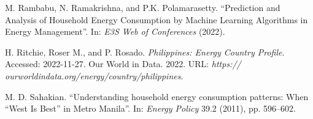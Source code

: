 \documentclass[runningheads]{llncs}
\begin{document}
\begin{thebibliography}{15}
M. Rambabu, N. Ramakrishna, and P.K. Polamarasetty. “Prediction and Analysis of Household Energy Consumption by Machine Learning Algorithms in Energy Management”. In: \textit{E3S Web of Conferences} (2022).

H. Ritchie, Roser M., and P. Rosado. \textit{Philippines: Energy Country Profile}. Accessed: 2022-11-27. Our World in Data. 2022. URL: \textit{https:// ourworldindata.org/energy/country/philippines}.

M. D. Sahakian. “Understanding household energy consumption patterns: When “West Is Best” in Metro Manila”. In: \textit{Energy Policy} 39.2 (2011), pp. 596–602.

\end{thebibliography}
\end{document}
